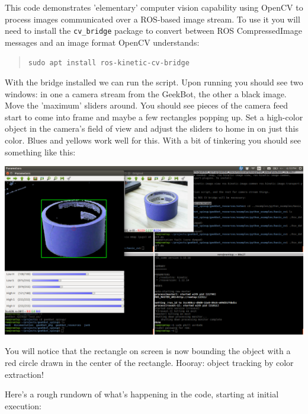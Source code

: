 This code demonstrates 'elementary' computer vision capability using
OpenCV to process images communicated over a ROS-based image stream. To
use it you will need to install the \texttt{cv\_bridge} package to
convert between ROS CompressedImage messages and an image format OpenCV
understands:

\begin{quote}
\texttt{sudo\ apt\ install\ ros-kinetic-cv-bridge}
\end{quote}

With the bridge installed we can run the script. Upon running you should
see two windows: in one a camera stream from the GeekBot, the other a
black image. Move the 'maximum' sliders around. You should see pieces of
the camera feed start to come into frame and maybe a few rectangles
popping up. Set a high-color object in the camera's field of view and
adjust the sliders to home in on just this color. Blues and yellows work
well for this. With a bit of tinkering you should see something like
this:

\includegraphics{figures/geekbot/repo_usage/cv_detect.png}

You will notice that the rectangle on screen is now bounding the object
with a red circle drawn in the center of the rectangle. Hooray: object
tracking by color extraction!

Here's a rough rundown of what's happening in the code, starting at
initial execution:

